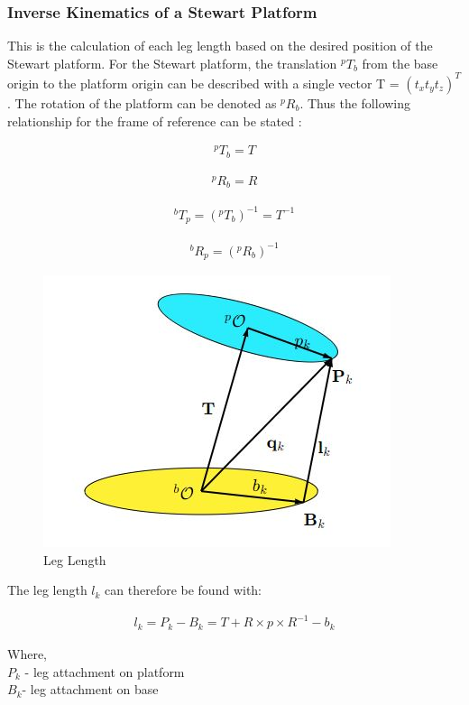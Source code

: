 \subsubsection{Inverse Kinematics of a Stewart Platform}
This is the calculation of each leg length based on the desired position of the Stewart platform. 
For the Stewart platform, the translation $^{p}T_{b}$ from the base origin to the platform origin can be described with a single vector T = $(t_{x} t_{y} t_{z})^{T} $. The rotation of the platform can be denoted as $^{p}R_{b}$. Thus the following relationship for the frame of reference can be stated \cite{Eisele_2019}:
	\begin{ceqn}
	\begin{align}
	^{p}T_{b} = T
	\end{align}
	\end{ceqn}
	\begin{ceqn}
	\begin{align}
	^{p}R_{b} = R
	\end{align}
	\end{ceqn}
	\begin{ceqn}
	\begin{align}
	^{b}T_{p} =(^{p}T_{b})^{-1} =T^{-1}
	\end{align}
	\end{ceqn}
	\begin{ceqn}
	\begin{align}
	^{b}R_{p} = (^{p}R_{b})^{-1}
	\end{align}
	\end{ceqn} 
\begin{center}
	\begin{figure}[!h]
	\centering
	\includegraphics[width=0.4\linewidth]{Figures/servo2}
	\caption[Leg length]{Leg Length \cite{Eisele_2019}}
	\end{figure}
\end{center}
The leg length $l_{k}$ can therefore be found with:
\begin{ceqn}
\begin{align}
	l_{k} = P_{k} - B_{k} = T + R \times p \times R^{-1} - b_{k}
\end{align}
\end{ceqn}
Where,\\
$P_{k}$ - leg attachment on platform \\
$B_{k}$- leg attachment on base 
